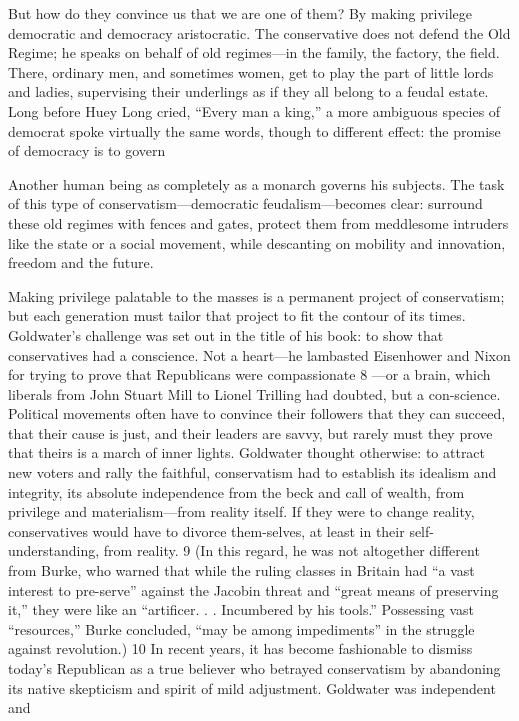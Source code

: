  \par 
But how do they convince us that we are one of them? By making privilege democratic and democracy aristocratic. The conservative does not defend the Old Regime; he speaks on behalf of old regimes—in the family, the factory, the field. There, ordinary men, and sometimes women, get to play the part of little lords and ladies, supervising their underlings as if they all belong to a feudal estate. Long before Huey Long cried, “Every man a king,” a more ambiguous species of democrat spoke virtually the same words, though to different effect: the promise of democracy is to govern
 \par 
Another human being as completely as a monarch governs his subjects. The task of this type of conservatism—democratic feudalism—becomes clear: surround these old regimes with fences and gates, protect them from meddlesome intruders like the state or a social movement, while descanting on mobility and innovation, freedom and the future.
 \par 
Making privilege palatable to the masses is a permanent project of conservatism; but each generation must tailor that project to fit the contour of its times. Goldwater’s challenge was set out in the title of his book: to show that conservatives had a conscience. Not a heart—he lambasted Eisenhower and Nixon for trying to prove that Republicans were compassionate {\color{blue}8} —or a brain, which liberals from John Stuart Mill to Lionel Trilling had doubted, but a con-science. Political movements often have to convince their followers that they can succeed, that their cause is just, and their leaders are savvy, but rarely must they prove that theirs is a march of inner lights. Goldwater thought otherwise: to attract new voters and rally the faithful, conservatism had to establish its idealism and integrity, its absolute independence from the beck and call of wealth, from privilege and materialism—from reality itself. If they were to change reality, conservatives would have to divorce them-selves, at least in their self-understanding, from reality. {\color{blue}9} (In this regard, he was not altogether different from Burke, who warned that while the ruling classes in Britain had “a vast interest to pre-serve” against the Jacobin threat and “great means of preserving it,” they were like an “artificer. . . Incumbered by his tools.” Possessing vast “resources,” Burke concluded, “may be among impediments” in the struggle against revolution.) {\color{blue}10} In recent years, it has become fashionable to dismiss today’s Republican as a true believer who betrayed conservatism by abandoning its native skepticism and spirit of mild adjustment. Goldwater was independent and
